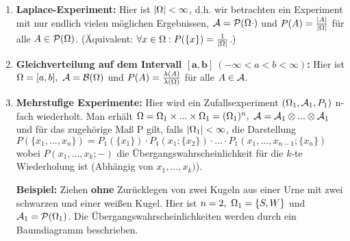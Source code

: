 \documentclass[parskip = full, 12pt]{scrartcl}
\begin{document}
\label{ss: Beispiel 2.3}
	\begin{enumerate}
		\item \textbf{Laplace-Experiment:} Hier ist $|\Omega| < \infty$, d.h. wir 
			betrachten ein Experiment mit nur endlich vielen möglichen Ergebnissen,
			$\mathcal{A} = \mathcal{P}(\Omega\cdot)$ und $P(A) = \frac{|A|}{|\Omega|}$ für alle $A \in \mathcal{P}(\Omega)
			$. (Äquivalent: $\forall x \in \Omega: P( \{x\} ) = \frac{1}{|\Omega|}$.)
		\item \textbf{Gleichverteilung auf dem Intervall $\bm{[a,b]}\ (-\infty < a
			<	b < \infty)$:} Hier ist $\Omega = [a,b],\ \mathcal{A} = \mathcal{B}(\Omega)$ und $P(A) = \frac
			{\lambda(A)}{\lambda(\Omega)}$ für alle $A \in \mathcal{A}$.
		\item \textbf{Mehrstufige Experimente:} Hier wird ein Zufallsexperiment
			$(\Omega_1, \mathcal{A}_1, P_1)$ n-fach wiederholt. Man erhält $\Omega = \Omega_1 \times 
			... \times \Omega_1 = (\Omega_1)^n,\ \mathcal{A} = \mathcal{A}_1 \otimes ... \otimes \mathcal{A}_1$ und
			für das zugehörige Maß P gilt, falls $|\Omega_1| < \infty$, die Darstellung
			$P(\{x_1, ..., x_n\}) = P_1(\{x_1\}) \cdot P_1(x_1; \{x_2\}) \cdot ...
			\cdot P_1(x_1, ..., x_{n-1};\{x_n\})$ wobei $P(x_1, ..., x_k; -)$  die 
			Übergangswahrscheinlichkeit für die $k$-te Wiederholung ist (Abhängig von
			$x_1, ..., x_k)$).

			\textbf{Beispiel:} Ziehen \textbf{ohne} Zurücklegen von zwei Kugeln aus
				einer Urne mit zwei schwarzen und einer weißen Kugel. Hier ist $n = 2,\ 
				\Om_1 = \{ S, W\}$ und $\mathcal{A}_1 = \mathcal{P}(\Omega_1)$. Die 
				Übergangswahrscheinlichkeiten werden durch ein Baumdiagramm beschrieben.

			\begin{center}
			\label{fig: Beispiel 2.3.c}
			\end{center}
	\end{enumerate}
\end{document}
